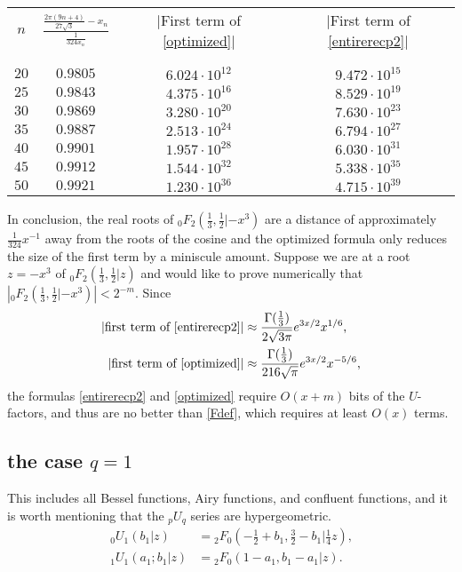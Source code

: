 \documentclass[12pt]{article}
\newcommand{\ee}[0] {e}
\numberwithin{equation}{section}
\newcommand{\FFf}[5] {{}_{#1}{#2}_{#3} \left(#4 | {#5} \right)}
\begin{document}
\begin{center}
\begin{tabular}{c|ccc}
$n$ & $\frac{\frac{2\pi(9n+4)}{27 \sqrt{3}} - x_n}{\frac{1}{324 x_n}}$ & $|$First term of \eqref{optimized}$|$ & $|$First term of \eqref{entirerecp2}$|$ \\[-2.0ex] \\ \hline \\ [-2ex]
 $20$ & $0.9805$ & $6.024\cdot10^{12}$ & $9.472\cdot10^{15}$ \\
 $25$ & $0.9843$ & $4.375\cdot10^{16}$ & $8.529\cdot10^{19}$ \\
 $30$ & $0.9869$ & $3.280\cdot10^{20}$ & $7.630\cdot10^{23}$ \\
 $35$ & $0.9887$ & $2.513\cdot10^{24}$ & $6.794\cdot10^{27}$ \\
 $40$ & $0.9901$ & $1.957\cdot10^{28}$ & $6.030\cdot10^{31}$ \\
 $45$ & $0.9912$ & $1.544\cdot10^{32}$ & $5.338\cdot10^{35}$ \\
 $50$ & $0.9921$ & $1.230\cdot10^{36}$ & $4.715\cdot10^{39}$
\end{tabular}
\end{center}
In conclusion, the real roots of $\FFf{0}{F}{2}{\tfrac{1}{3},\tfrac{1}{2}}{-x^3}$ are a distance of approximately $\tfrac{1}{324} x^{-1}$ away from the roots of the cosine and the optimized formula only reduces the size of the first term by a miniscule amount. Suppose we are at a root $z=-x^3$ of $\FFf{0}{F}{2}{\tfrac{1}{3},\tfrac{1}{2}}{z}$ and would like to prove numerically that $|\FFf{0}{F}{2}{\tfrac{1}{3},\tfrac{1}{2}}{-x^3}|<2^{-m}$. Since
\begin{align*}
|\text{first term of \eqref{entirerecp2}}| &\approx \frac{\Gamma(\tfrac13)}{2 \sqrt{3 \pi}} \ee^{3x/2} x^{1/6}\text{,}\\
|\text{first term of \eqref{optimized}}| &\approx \frac{\Gamma(\tfrac13)}{216 \sqrt{\pi}} \ee^{3x/2} x^{-5/6}\text{,}
\end{align*}
the formulas \eqref{entirerecp2} and \eqref{optimized} require $O(x+m)$ bits of the $U$-factors, and thus are no better than \eqref{Fdef}, which requires at least $O(x)$ terms.


\subsection{the case $q=1$} This includes all Bessel functions, Airy functions, and confluent functions, and it is worth mentioning that the ${}_p U_{q}$ series are hypergeometric.
\begin{align*}
\FFf{0}{U}{1}{b_1}{z} &= \FFf{2}{F}{0}{-\tfrac{1}{2}+b_1, \tfrac{3}{2}-b_1}{\tfrac{1}{4}z}\text{,}\\
\FFf{1}{U}{1}{a_1;b_1}{z} &= \FFf{2}{F}{0}{1-a_1, b_1-a_1}{z}\text{.}
\end{align*}
\end{document}
